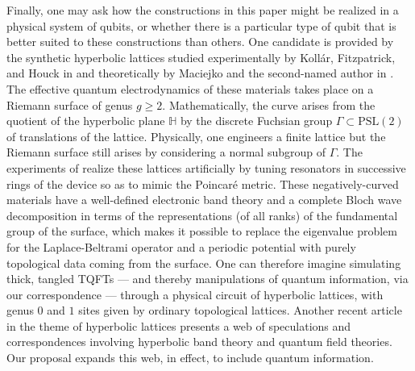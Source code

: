 \documentclass{amsart}
\numberwithin{thm}{section}
\theoremstyle{definition}
\begin{document}
Finally, one may ask how the constructions in this paper might be realized in a physical system of qubits, or whether there is a particular type of qubit that is better suited to these constructions than others.  One candidate is provided by the synthetic hyperbolic lattices studied experimentally by Koll\'ar, Fitzpatrick, and Houck in \cite{KFH} and theoretically by Maciejko and the second-named author in \cite{MR1}.  The effective quantum electrodynamics of these materials takes place on a Riemann surface of genus $g\geq2$.  Mathematically, the curve arises from the quotient of the hyperbolic plane $\mathbb H$ by the discrete Fuchsian group $\Gamma\subset\mbox{PSL}(2)$ of translations of the lattice.  Physically, one engineers a finite lattice but the Riemann surface still arises by considering a normal subgroup of $\Gamma$.  The experiments of \cite{KFH} realize these lattices artificially by tuning resonators in successive rings of the device so as to mimic the Poincar\'e metric. These negatively-curved materials have a well-defined electronic band theory \cite{MR1} and a complete Bloch wave decomposition \cite{MR2} in terms of the representations (of all ranks) of the fundamental group of the surface, which makes it possible to replace the eigenvalue problem for the Laplace-Beltrami operator and a periodic potential with purely topological data coming from the surface.  One can therefore imagine simulating thick, tangled TQFTs --- and thereby manipulations of quantum information, via our correspondence --- through a physical circuit of hyperbolic lattices, with genus $0$ and $1$ sites given by ordinary topological lattices.  Another recent article \cite{KR} in the theme of hyperbolic lattices presents a web of speculations and correspondences involving hyperbolic band theory and quantum field theories.  Our proposal expands this web, in effect, to include quantum information.



%

\pagebreak


{}

\end{document}
